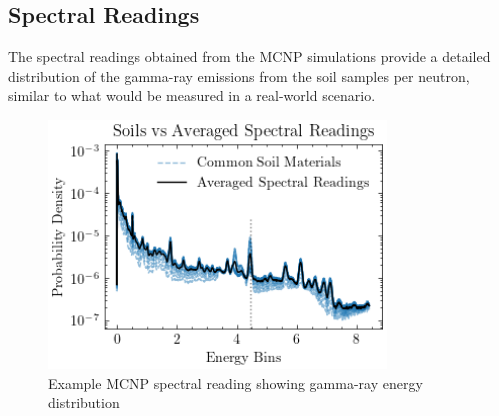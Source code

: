 \subsection{Spectral Readings}

The spectral readings obtained from the MCNP simulations provide a detailed distribution of the gamma-ray emissions from the soil samples per neutron, similar to what would be measured in a real-world scenario.

\begin{figure}[H]
\centering
\includegraphics[width=0.8\textwidth]{../Figures/DataGeneration/MCNPSpectralReading.png}
\caption{Example MCNP spectral reading showing gamma-ray energy distribution}
\label{fig:mcnp_spectral}
\end{figure}